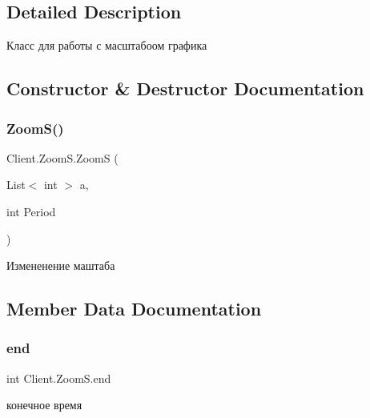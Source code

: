\subsection{Detailed Description}
Класс для работы с масштабоом графика 



\subsection{Constructor \& Destructor Documentation}
\hypertarget{class_client_1_1_zoom_s_acb727e42e42338ff7d2381368cdf8645}{}\label{class_client_1_1_zoom_s_acb727e42e42338ff7d2381368cdf8645} 
\subsubsection{\texorpdfstring{Zoom\+S()}{ZoomS()}}
{\footnotesize\ttfamily Client.\+Zoom\+S.\+ZoomS (\begin{DoxyParamCaption}\item[{List$<$ int $>$}]{a,  }\item[{int}]{Period }\end{DoxyParamCaption})\hspace{0.3cm}{\ttfamily [inline]}}



Измененение маштаба 



\subsection{Member Data Documentation}
\hypertarget{class_client_1_1_zoom_s_a27e81af9efa762e3a2cc24833111a232}{}\label{class_client_1_1_zoom_s_a27e81af9efa762e3a2cc24833111a232} 
\subsubsection{\texorpdfstring{end}{end}}
{\footnotesize\ttfamily int Client.\+Zoom\+S.\+end}



конечное время 

\hypertarget{class_client_1_1_zoom_s_a86111434f20994bf245105ff9378e3bb}{}\label{class_client_1_1_zoom_s_a86111434f20994bf245105ff9378e3bb} 
